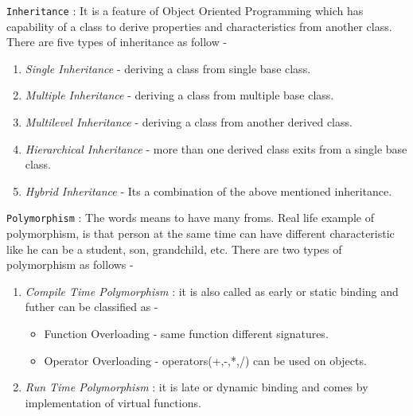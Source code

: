 \documentclass[oops.tex]{subfiles}
\begin{document}
\texttt{Inheritance} : It is a feature of Object Oriented Programming which 
has capability of a class to derive properties and characteristics from another 
class. There are five types of inheritance as follow - 
\begin{enumerate}
    \item \emph{Single Inheritance} - deriving a class from single base class.
    \item \emph{Multiple Inheritance} - deriving a class from multiple base class.
    \item \emph{Multilevel Inheritance} - deriving a class from another derived class.
    \item \emph{Hierarchical Inheritance} - more than one derived class exits
                from a single base class.
    \item \emph{Hybrid Inheritance} - Its a combination of the above mentioned
                inheritance.\\
\end{enumerate}

\texttt{Polymorphism} : The words means to have many froms. Real life example of
polymorphism, is that person at the same time can have different characteristic 
like he can be a student, son, grandchild, etc. There are two types of
polymorphism as follows - 
\begin{enumerate}
    \item \emph{Compile Time Polymorphism} : it is also called as early or
          static binding and futher can be classified as - 
          \begin{itemize}
              \item Function Overloading - same function different signatures.
              \item Operator Overloading - operators(+,-,*,/) can be used on objects.
          \end{itemize}
    \item \emph{Run Time Polymorphism} : it is late or dynamic binding and
          comes by implementation of virtual functions.
\end{enumerate}
\end{document}
